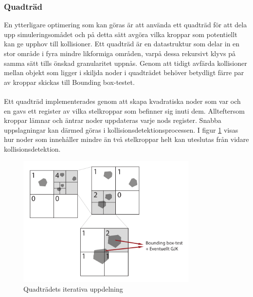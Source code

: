\documentclass[a4paper,12pt,twopage,swedish]{article}
\begin{document}
\subsubsection{Quadträd}

En ytterligare optimering som kan göras är att använda ett quadträd för att dela upp simuleringsomådet och på detta sätt avgöra vilka kroppar som potentiellt kan ge upphov till kollisioner. Ett quadträd är en datastruktur som delar in en stor område i fyra mindre likformiga områden, varpå dessa rekursivt klyvs på samma sätt tills önskad granularitet uppnås. Genom att tidigt avfärda kollisioner mellan objekt som ligger i skiljda noder i quadträdet behöver betydligt färre  par av kroppar skickas till Bounding box-testet. 
\\
\\Ett quadträd implementerades genom att skapa kvadratiska noder som var och en gavs ett register av vilka stelkroppar som befinner sig inuti dem. Allteftersom kroppar lämnar och äntrar noder uppdateras varje nods register. Snabba uppslagningar kan därmed göras i kollisionsdetektionsprocessen. I figur  \ref{fig:quadtree} visas hur noder som innehåller mindre än två stelkroppar helt kan uteslutas från vidare kollisionsdetektion.

\begin{figure}[H]
\centering
\includegraphics[width=0.8\textwidth]{illustrations/quadtree.pdf}
\caption{Quadträdets iterativa uppdelning}
\label{fig:quadtree}
\end{figure}


\end{document}
